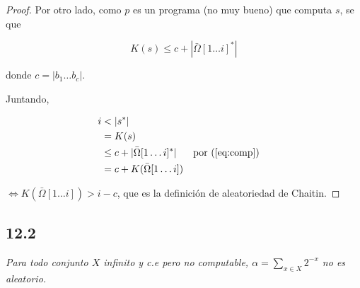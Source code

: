 \documentclass{article}
\theoremstyle{definition} %
\newcommand{\first}[2]{#2[1 \dots #1]}
\begin{document}
\begin{proof}
    Por otro lado, como $p$ es un programa (no muy bueno) que computa $s$, se que

    \begin{equation}\label{eq:comp}
         K(s) \leq c + |\first{i}{\bar{\Omega}}^*|
    \end{equation}

    donde $c = |b_1 \dots b_c|$.

    Juntando,

    \begin{align*}
        i
            &< |s^*|\\
            &= K(s)\\
            &\leq c + |\first{i}{\bar{\Omega}}^*| &&\text{por (\ref{eq:comp})}\\
            &= c + K(\first{i}{\bar{\Omega}})
    \end{align*}

    $\iff K(\first{i}{\bar{\Omega}}) > i - c$, que es la definición de
    aleatoriedad de Chaitin.

\end{proof}

\subsection*{12.2}

\textit{Para todo conjunto $X$ infinito y c.e pero no computable, $\alpha =
\sum_{x \in X} 2^{-x}$ no es aleatorio.}
\end{document}
